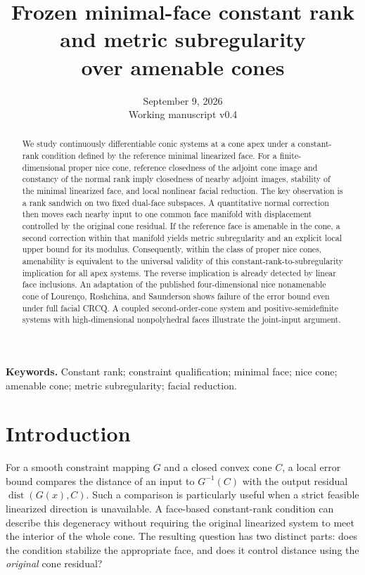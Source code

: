 \documentclass[11pt]{article}
\title{Frozen minimal-face constant rank and metric subregularity\protect\\
  over amenable cones}
\author{\authorname}
\date{September 9, 2026\\[3pt]\small Working manuscript v0.4}
\numberwithin{equation}{section}
\theoremstyle{definition}
\theoremstyle{remark}
\DeclareMathOperator{\dist}{dist}
\newcommand{\dset}[2]{\dist(#1,#2)}
\begin{document}
\maketitle

\begin{abstract}
We study continuously differentiable conic systems at a cone apex under a
constant-rank condition defined by the reference minimal linearized face.
For a finite-dimensional proper nice cone, reference closedness of the
adjoint cone image and constancy of the normal rank imply closedness of
nearby adjoint images, stability of the minimal linearized face, and local
nonlinear facial reduction. The key observation is a rank sandwich on two
fixed dual-face subspaces. A quantitative normal correction then moves
each nearby input to one common face manifold with displacement controlled
by the original cone residual. If the reference face is amenable in the
cone, a second correction within that manifold yields metric
subregularity and an explicit local upper bound for its modulus.
Consequently, within the class of proper nice cones, amenability is
equivalent to the universal validity of this constant-rank-to-subregularity
implication for all apex systems. The reverse implication is already
detected by linear face inclusions. An adaptation of the published
four-dimensional nice nonamenable cone of Louren\c{c}o, Roshchina, and
Saunderson shows failure of the error bound even under full facial CRCQ.
A coupled second-order-cone system and positive-semidefinite systems with
high-dimensional nonpolyhedral faces illustrate the joint-input argument.
\end{abstract}

\noindent\textbf{Keywords.} Constant rank; constraint qualification;
minimal face; nice cone; amenable cone; metric subregularity; facial reduction.

\section{Introduction}
\label{sec:introduction}

For a smooth constraint mapping $G$ and a closed convex cone $C$, a local
error bound compares the distance of an input to $G^{-1}(C)$ with the
output residual $\dset{G(x)}{C}$. Such a comparison is particularly useful
when a strict feasible linearized direction is unavailable. A face-based
constant-rank condition can describe this degeneracy without requiring
the original linearized system to meet the interior of the whole cone.
The resulting question has two distinct parts: does the condition
stabilize the appropriate face, and does it control distance using the
\emph{original} cone residual?
\end{document}
